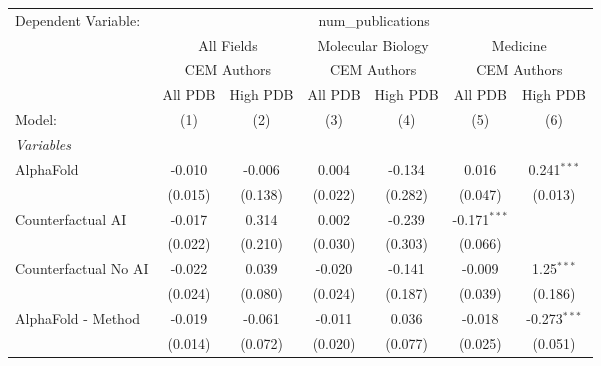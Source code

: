 \begingroup
\centering
\begin{tabular}{lcccccc}
   \tabularnewline \midrule \midrule
   Dependent Variable: & \multicolumn{6}{c}{num\_publications}\\
 & \multicolumn{2}{c}{All Fields} & \multicolumn{2}{c}{Molecular Biology} & \multicolumn{2}{c}{Medicine} \\
\cmidrule(lr){2-3} \cmidrule(lr){4-5} \cmidrule(lr){6-7}
 & \multicolumn{2}{c}{CEM Authors} & \multicolumn{2}{c}{CEM Authors} & \multicolumn{2}{c}{CEM Authors} \\
\cmidrule(lr){2-3} \cmidrule(lr){4-5} \cmidrule(lr){6-7}
 & \multicolumn{1}{c}{All PDB} & \multicolumn{1}{c}{High PDB} & \multicolumn{1}{c}{All PDB} & \multicolumn{1}{c}{High PDB} & \multicolumn{1}{c}{All PDB} & \multicolumn{1}{c}{High PDB} \\
\cmidrule(lr){2-2} \cmidrule(lr){3-3} \cmidrule(lr){4-4} \cmidrule(lr){5-5} \cmidrule(lr){6-6} \cmidrule(lr){7-7}
   Model:                                                     & (1)          & (2)     & (3)     & (4)     & (5)            & (6)\\  
   \midrule
   \emph{Variables}\\
   AlphaFold                                                  & -0.010       & -0.006  & 0.004   & -0.134  & 0.016          & 0.241$^{***}$\\   
                                                              & (0.015)      & (0.138) & (0.022) & (0.282) & (0.047)        & (0.013)\\   
   Counterfactual AI                                          & -0.017       & 0.314   & 0.002   & -0.239  & -0.171$^{***}$ &   \\   
                                                              & (0.022)      & (0.210) & (0.030) & (0.303) & (0.066)        &   \\   
   Counterfactual No AI                                       & -0.022       & 0.039   & -0.020  & -0.141  & -0.009         & 1.25$^{***}$\\   
                                                              & (0.024)      & (0.080) & (0.024) & (0.187) & (0.039)        & (0.186)\\   
   AlphaFold - Method                                         & -0.019       & -0.061  & -0.011  & 0.036   & -0.018         & -0.273$^{***}$\\   
                                                              & (0.014)      & (0.072) & (0.020) & (0.077) & (0.025)        & (0.051)\\   

\end{tabular}
